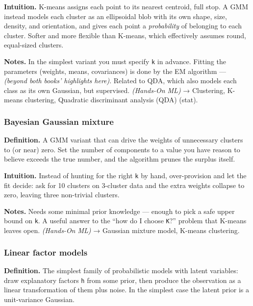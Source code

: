 \documentclass[
  10pt,
  letterpaper,
  onecolumn]{article}
\begin{document}
\textbf{Intuition.} K-means assigns each point to its nearest centroid,
full stop. A GMM instead models each cluster as an ellipsoidal blob with
its own shape, size, density, and orientation, and gives each point a
\emph{probability} of belonging to each cluster. Softer and more
flexible than K-means, which effectively assumes round, equal-sized
clusters.

\textbf{Notes.} In the simplest variant you must specify \texttt{k} in
advance. Fitting the parameters (weights, means, covariances) is done by
the EM algorithm --- \emph{(beyond both books' highlights here)}.
Related to QDA, which also models each class as its own Gaussian, but
supervised. \emph{(Hands-On ML)} → Clustering, K-means clustering,
Quadratic discriminant analysis (QDA) (stat).

\hypertarget{bayesian-gaussian-mixture}{%
\subsubsection{Bayesian Gaussian
mixture}\label{bayesian-gaussian-mixture}}

\textbf{Definition.} A GMM variant that can drive the weights of
unnecessary clusters to (or near) zero. Set the number of components to
a value you have reason to believe exceeds the true number, and the
algorithm prunes the surplus itself.

\textbf{Intuition.} Instead of hunting for the right \texttt{k} by hand,
over-provision and let the fit decide: ask for 10 clusters on 3-cluster
data and the extra weights collapse to zero, leaving three non-trivial
clusters.

\textbf{Notes.} Needs some minimal prior knowledge --- enough to pick a
safe upper bound on \texttt{k}. A useful answer to the ``how do I choose
\texttt{K}?'' problem that K-means leaves open. \emph{(Hands-On ML)} →
Gaussian mixture model, K-means clustering.

\hypertarget{linear-factor-models}{%
\subsubsection{Linear factor models}\label{linear-factor-models}}

\textbf{Definition.} The simplest family of probabilistic models with
latent variables: draw explanatory factors \texttt{h} from some prior,
then produce the observation as a linear transformation of them plus
noise. In the simplest case the latent prior is a unit-variance
Gaussian.
\end{document}
